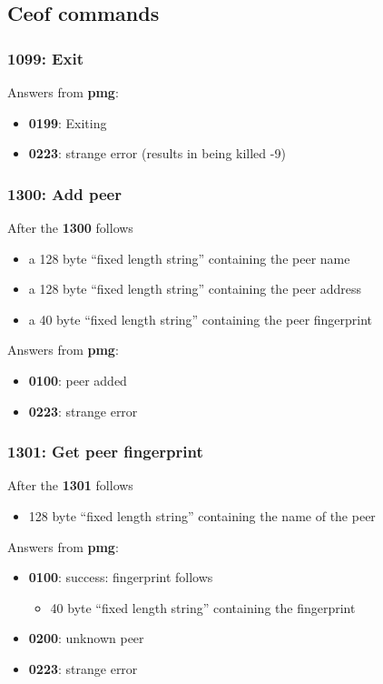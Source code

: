 \documentclass[12pt,a4paper]{book}
\begin{document}
\subsection{Ceof commands}
\subsubsection{1099: Exit}
Answers from \textbf{pmg}:
\begin{itemize}
\item \textbf{0199}: Exiting
\item \textbf{0223}: strange error (results in being killed -9)
\end{itemize}
\subsubsection{1300: Add peer}
After the \textbf{1300} follows
\begin{itemize}
\item a 128 byte "`fixed length string"' containing the peer name
\item a 128 byte "`fixed length string"' containing the peer address
\item a 40 byte  "`fixed length string"' containing the peer fingerprint
\end{itemize}
Answers from \textbf{pmg}:
\begin{itemize}
\item \textbf{0100}: peer added
\item \textbf{0223}: strange error
\end{itemize}
\subsubsection{1301: Get peer fingerprint}
After the \textbf{1301} follows
\begin{itemize}
\item 128 byte "`fixed length string"' containing the name of the peer
\end{itemize}
Answers from \textbf{pmg}:
\begin{itemize}
\item \textbf{0100}: success: fingerprint follows
\begin{itemize}
\item 40 byte "`fixed length string"' containing the fingerprint
\end{itemize}
\item \textbf{0200}: unknown peer
\item \textbf{0223}: strange error
\end{itemize}
\end{document}
